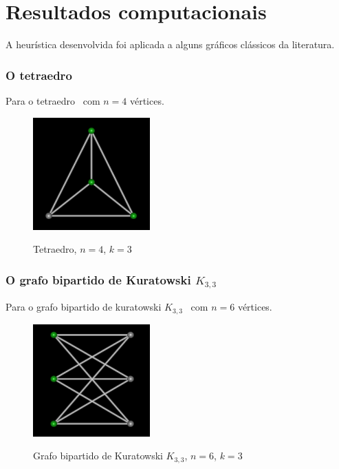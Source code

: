 \part{Resultados computacionais}
\label{sec:resultados}

A heurística desenvolvida foi aplicada a alguns gráficos clássicos da
literatura.

\section{O tetraedro}
Para o tetraedro~\cite{cite:example-plato} com $n=4$ vértices.

\begin{figure}[htb]
\centering
\includegraphics[width=0.4\textwidth]{img/tetraedro.png}
\label{fig:example-tetraedro}
\caption{Tetraedro, $n=4$, $k=3$}
\end{figure}

\section{O grafo bipartido de Kuratowski $K_{3,3}$}
Para o grafo bipartido de kuratowski
$K_{3,3}$~\cite{cite:example-kuratowski} com $n=6$ vértices.

\begin{figure}[htb]
\centering
\includegraphics[width=0.4\textwidth]{img/kuratowski.png}
\label{fig:example-kuratowski}
\caption{Grafo bipartido de Kuratowski $K_{3,3}$, $n=6$, $k=3$}
\end{figure}


